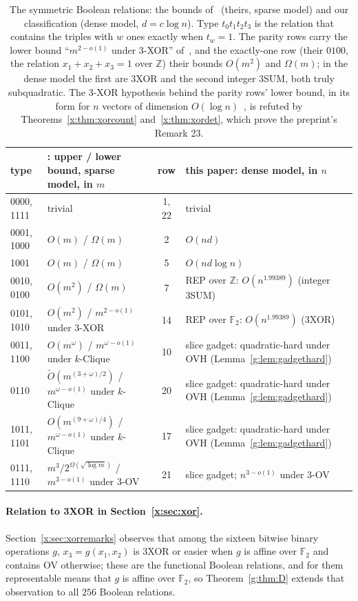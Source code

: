 \documentclass[11pt]{article}
\theoremstyle{definition}
\theoremstyle{remark}
\newcommand{\Z}{\mathbb{Z}}
\newcommand{\F}{\mathbb{F}_2}
\newcommand{\ExpBestUp}{1.99389}%
\begin{document}
\begin{table}[ht]
\centering\small
\renewcommand{\arraystretch}{1.1}
\begin{tabular}{@{}l>{\raggedright}p{4.4cm}c>{\raggedright\arraybackslash}p{5.2cm}@{}}
type & \cite[Table~1]{BFK19}: upper / lower bound, sparse model, in $m$ & row & this paper: dense model, in $n$\\\hline
0000, 1111 & trivial & 1, 22 & trivial\\
0001, 1000 & $O(m)$ / $\Omega(m)$ & 2 & $O(nd)$\\
1001 & $O(m)$ / $\Omega(m)$ & 5 & $O(nd\log n)$\\
0010, 0100 & $O(m^2)$ / $\Omega(m)$ & 7 & REP over $\Z$: $O(n^{\ExpBestUp})$ (integer 3SUM)\\
0101, 1010 & $O(m^2)$ / $m^{2-o(1)}$ under 3-XOR & 14 & REP over $\F$: $O(n^{\ExpBestUp})$ (3XOR)\\
0011, 1100 & $O(m^\omega)$ / $m^{\omega-o(1)}$ under $k$-Clique & 10 & slice gadget: quadratic-hard under OVH (Lemma~\ref{g:lem:gadgethard})\\
0110 & $\tilde O(m^{(3+\omega)/2})$ / $m^{\omega-o(1)}$ under $k$-Clique & 20 & slice gadget: quadratic-hard under OVH (Lemma~\ref{g:lem:gadgethard})\\
1011, 1101 & $O(m^{(9+\omega)/4})$ / $m^{\omega-o(1)}$ under $k$-Clique & 17 & slice gadget: quadratic-hard under OVH (Lemma~\ref{g:lem:gadgethard})\\
0111, 1110 & $m^3/2^{\Omega(\sqrt{\log m})}$ / $m^{3-o(1)}$ under 3-OV & 21 & slice gadget; $n^{3-o(1)}$ under 3-OV
\end{tabular}
\caption{The symmetric Boolean relations: the bounds of~\cite[Table~1]{BFK19} (theirs, sparse model) and our classification (dense model, $d=c\log n$). Type $t_0t_1t_2t_3$ is the relation that contains the triples with $w$ ones exactly when $t_w=1$. The parity rows carry the lower bound ``$m^{2-o(1)}$ under 3-XOR'' of~\cite{BFK19}, and the exactly-one row (their $0100$, the relation $x_1+x_2+x_3=1$ over $\Z$) their bounds $O(m^2)$ and $\Omega(m)$; in the dense model the first are 3XOR and the second integer 3SUM, both truly subquadratic. The 3-XOR hypothesis behind the parity rows' lower bound, in its form for $n$ vectors of dimension $O(\log n)$~\cite{JV16}, is refuted by Theorems~\ref{x:thm:xorcount} and~\ref{x:thm:xordet}, which prove the preprint's Remark 23.}
\label{g:tab:bfk}
\end{table}

\paragraph{Relation to 3XOR in Section~\ref{x:sec:xor}.} Section~\ref{x:sec:xorremarks} observes that among the sixteen bitwise binary operations $g$, $x_3=g(x_1,x_2)$ is 3XOR or easier when $g$ is affine over $\F$ and contains OV otherwise; these are the functional Boolean relations, and for them representable means that $g$ is affine over $\F$, so Theorem~\ref{g:thm:D} extends that observation to all $256$ Boolean relations.
\end{document}
